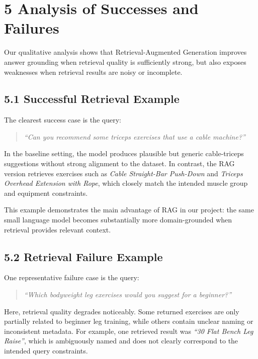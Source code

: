\documentclass[fleqn,moreauthors,10pt]{ds_report}
\begin{document}
\section*{5 Analysis of Successes and Failures}

Our qualitative analysis shows that Retrieval-Augmented Generation improves answer grounding when retrieval quality is sufficiently strong, but also exposes weaknesses when retrieval results are noisy or incomplete.

\subsection*{5.1 Successful Retrieval Example}

The clearest success case is the query:

\begin{quote}
\emph{``Can you recommend some triceps exercises that use a cable machine?''}
\end{quote}

In the baseline setting, the model produces plausible but generic cable-triceps suggestions without strong alignment to the dataset. In contrast, the RAG version retrieves exercises such as \emph{Cable Straight-Bar Push-Down} and \emph{Triceps Overhead Extension with Rope}, which closely match the intended muscle group and equipment constraints.

This example demonstrates the main advantage of RAG in our project: the same small language model becomes substantially more domain-grounded when retrieval provides relevant context.

\subsection*{5.2 Retrieval Failure Example}

One representative failure case is the query:

\begin{quote}
\emph{``Which bodyweight leg exercises would you suggest for a beginner?''}
\end{quote}

Here, retrieval quality degrades noticeably. Some returned exercises are only partially related to beginner leg training, while others contain unclear naming or inconsistent metadata. For example, one retrieved result was \emph{``30 Flat Bench Leg Raise''}, which is ambiguously named and does not clearly correspond to the intended query constraints.
\end{document}
